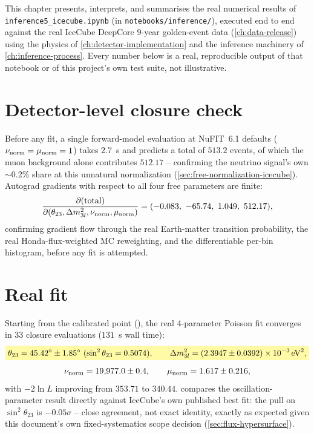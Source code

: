 \label{ch:results}

This chapter presents, interprets, and summarises the real numerical
results of \texttt{inference5\_icecube.ipynb} (in
\texttt{notebooks/inference/}), executed end to end against the real
IceCube DeepCore 9-year golden-event data (\cref{ch:data-release}) using
the physics of \cref{ch:detector-implementation} and the inference
machinery of \cref{ch:inference-process}. Every number below is a real,
reproducible output of that notebook or of this project's own test suite,
not illustrative.

\section{Detector-level closure check}

\begin{resultbox}
Before any fit, a single forward-model evaluation at NuFIT~6.1 defaults
($\nu_{\rm norm}=\mu_{\rm norm}=1$) takes $2.7$~s and predicts a total of
$513.2$ events, of which the muon background alone contributes $512.17$
-- confirming the neutrino signal's own $\sim$0.2\% share at this
unnatural normalization (\cref{sec:free-normalization-icecube}).
Autograd gradients with respect to all four free parameters are finite:
\begin{equation}
  \frac{\partial(\text{total})}{\partial(\theta_{23},\Delta m^2_{3l},\nu_{\rm norm},\mu_{\rm norm})}
  = (-0.083,\ -65.74,\ 1.049,\ 512.17),
\end{equation}
confirming gradient flow through the real Earth-matter transition
probability, the real Honda-flux-weighted MC reweighting, and the
differentiable per-bin histogram, before any fit is attempted.
\end{resultbox}

\section{Real fit}
\label{sec:results-fit}

\begin{resultbox}
Starting from the calibrated point (), the real
4-parameter Poisson fit converges in 33 closure evaluations
($131$~s wall time):
\begin{equation}
  \keyresult{\theta_{23} = 45.42^\circ \pm 1.85^\circ\ (\sin^2\theta_{23}=0.5074), \qquad
    \Delta m^2_{3l} = (2.3947\pm0.0392)\times10^{-3}\,{\rm eV}^2,}
\end{equation}
\begin{equation}
  \nu_{\rm norm} = 19{,}977.0\pm0.4, \qquad \mu_{\rm norm} = 1.617\pm0.216,
\end{equation}
with $-2\ln L$ improving from $353.71$ to $340.44$.
 compares the oscillation-parameter result
directly against IceCube's own published best fit: the pull on
$\sin^2\theta_{23}$ is $-0.05\sigma$ -- close agreement, not exact
identity, exactly as expected given this document's own fixed-systematics
scope decision (\cref{sec:flux-hypersurface}).
\end{resultbox}

